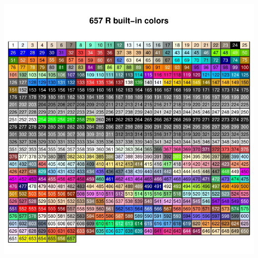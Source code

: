 \documentclass[12pt]{beamer}\usepackage[]{graphicx}\usepackage[]{color}
\newenvironment{knitrout}{}{} %
\begin{document}
\begin{frame}[fragile]

\begin{knitrout}\tiny
{}\color{fgcolor}

{\centering \includegraphics[width=.85\linewidth,height=.85\linewidth]{figure/R_colors-1} 

}



\end{knitrout}

\end{frame}

\end{document}
